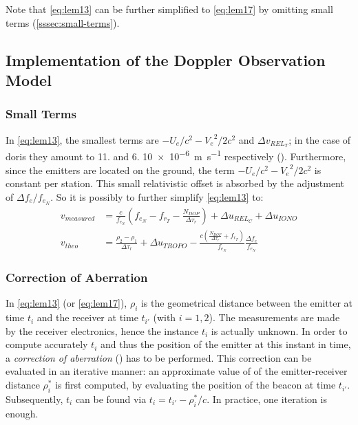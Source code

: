 Note that \autoref{eq:lem13} can be further simplified to \autoref{eq:lem17} by 
omitting small terms (\autoref{sssec:small-terms}).

\subsection{Implementation of the Doppler Observation Model}\label{ssec:obs-model-implementation}

\subsubsection{Small Terms}\label{sssec:small-terms}
In \autoref{eq:lem13}, the smallest terms are $-U_e / c^2 - {V_e}^2 / 2 c^2$ and 
$\Delta v_{{REL}_T}$; in the case of \gls{doris} they amount to \num{11.} and 
\num{6.} \SI{10e-6}{\meter\per\second} respectively (\cite{Lemoine2016}). 
Furthermore, since the emitters are located on the ground, the term 
$-U_e / c^2 - {V_e}^2 / 2 c^2$ is constant per station. This small 
relativistic offset is absorbed by the adjustment of $\Delta f_e / f_{e_N}$. 
So it is possibly to further simplify \autoref{eq:lem13} to:
\begin{subequations}\label{eq:lem17}
    \begin{align}
        v_{measured} & = \frac{c}{f_{e_N}} (f_{e_N} - f_{r_T} -
          \frac{N_{DOP}}{\Delta\tau_r}) + 
          \Delta u_{{REL}_C} + \Delta u_{IONO} \label{eq:lem17a}\\
        v_{theo} &= \frac{\rho_2 - \rho_1}{\Delta\tau_r} + \Delta u_{TROPO} - 
          \frac{c(\frac{N_{DOP}}{\Delta\tau_r} + f_{r_T})}{f_{e_N}} 
          \frac{\Delta f_e}{f_{e_N}} \label{eq:lem17b}
    \end{align}
\end{subequations}

\subsubsection{Correction of Aberration}\label{sssec:doris-aberration}
In \autoref{eq:lem13} (or \autoref{eq:lem17}), $\rho _i$ is the geometrical distance 
between the emitter at time $t_i$ and the receiver at time $t_{i'}$ (with $i=1,2$). 
The measurements are made by the receiver electronics, hence the instance $t_i$ is 
actually unknown. In order to compute accurately $t_i$ and thus the position of 
the emitter at this instant in time, a \emph{correction of aberration} (\cite{Lemoine2016}) 
has to be performed. This correction can be evaluated in an iterative manner: an 
approximate value of of the emitter-receiver distance $\rho ^{*} _i$ is first computed, 
by evaluating the position of the beacon at time $t_{i'}$. Subsequently, $t_i$ can be 
found via $t_i = t_{i'} - \rho ^{*} _i / c$. In practice, one iteration is enough.

